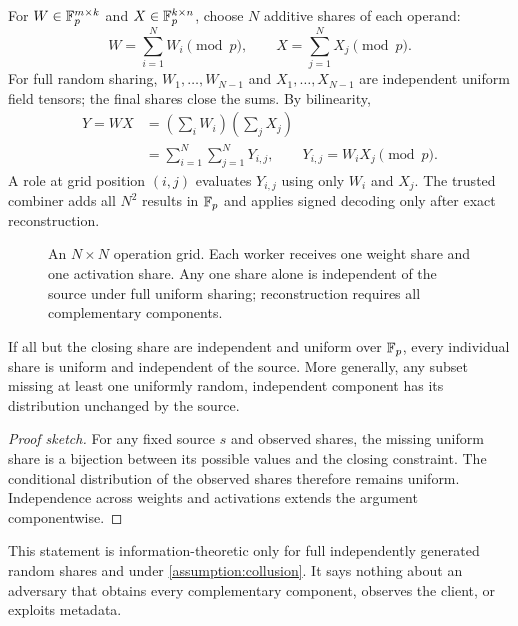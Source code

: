 For $W\in\mathbb{F}_{p}^{m\times k}$ and $X\in\mathbb{F}_{p}^{k\times n}$, choose $N$ additive shares of each operand:
\begin{equation}
W=\sum_{i=1}^{N}W_i\pmod p,\qquad
X=\sum_{j=1}^{N}X_j\pmod p.
\label{eq:shares}
\end{equation}
For full random sharing, $W_1,\ldots,W_{N-1}$ and $X_1,\ldots,X_{N-1}$ are independent uniform field tensors; the final shares close the sums. By bilinearity,
\begin{align}
Y=WX
&=\left(\sum_iW_i\right)\left(\sum_jX_j\right)\nonumber\\
&=\sum_{i=1}^{N}\sum_{j=1}^{N}Y_{i,j},\qquad Y_{i,j}=W_iX_j\pmod p.
\label{eq:grid}
\end{align}
A role at grid position $(i,j)$ evaluates $Y_{i,j}$ using only $W_i$ and $X_j$. The trusted combiner adds all $N^2$ results in $\mathbb{F}_{p}$ and applies signed decoding only after exact reconstruction.

\begin{figure}[htbp]
\centering

\caption{An $N\times N$ operation grid. Each worker receives one weight share and one activation share. Any one share alone is independent of the source under full uniform sharing; reconstruction requires all complementary components.}
\label{fig:share-grid}
\end{figure}

\begin{proposition}\label{prop:hiding}
If all but the closing share are independent and uniform over $\mathbb{F}_{p}$, every individual share is uniform and independent of the source. More generally, any subset missing at least one uniformly random, independent component has its distribution unchanged by the source.
\end{proposition}
\begin{proof}[Proof sketch]
For any fixed source $s$ and observed shares, the missing uniform share is a bijection between its possible values and the closing constraint. The conditional distribution of the observed shares therefore remains uniform. Independence across weights and activations extends the argument componentwise.
\end{proof}

This statement is information-theoretic only for full independently generated random shares and under \cref{assumption:collusion}. It says nothing about an adversary that obtains every complementary component, observes the client, or exploits metadata.

